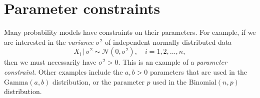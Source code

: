  


























































































\newpage
\section{Parameter constraints}

Many probability models have constraints on their parameters. For example, if we are interested in the \emph{variance} $\sigma^2$ of independent normally distributed data
$$ X_i\,|\, \sigma^2 \sim \mathcal{N}(0, \sigma^2), \quad i = 1,2,\ldots,n, $$
then we must necessarily have $\sigma^2 > 0$. This is an example of a \emph{parameter constraint}. Other examples include the $a,b > 0$ parameters that are used in the $\text{Gamma}(a,b)$ distribution, or the parameter $p$ used in the $\text{Binomial}(n,p)$ distribution.

